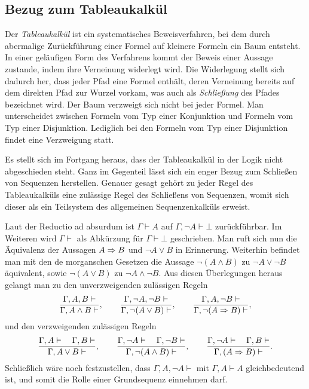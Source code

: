 \subsection{Bezug zum Tableaukalkül}

Der \emph{Tableaukalkül} ist ein
systematisches Beweisverfahren, bei dem durch abermalige Zurückführung
einer Formel auf kleinere Formeln ein Baum entsteht. In einer
geläufigen Form des Verfahrens kommt der Beweis einer Aussage zustande,
indem ihre Verneinung widerlegt wird. Die Widerlegung stellt sich
dadurch her, dass jeder Pfad eine Formel enthält, deren
Verneinung bereits auf dem direkten Pfad zur Wurzel vorkam, was auch
als \emph{Schließung} des Pfades bezeichnet wird. Der Baum verzweigt
sich nicht bei jeder Formel. Man unterscheidet zwischen
Formeln vom Typ einer Konjunktion und Formeln vom Typ einer
Disjunktion. Lediglich bei den Formeln vom Typ einer Disjunktion
findet eine Verzweigung statt.

Es stellt sich im Fortgang heraus, dass der Tableaukalkül in der Logik
nicht abgeschieden steht. Ganz im Gegenteil lässt sich ein enger Bezug
zum Schließen von Sequenzen herstellen. Genauer gesagt gehört zu jeder
Regel des Tableaukalküls eine zulässige Regel des Schließens von
Sequenzen, womit sich dieser als ein Teilsystem des allgemeinen
Sequenzenkalküls erweist.

Laut der Reductio ad absurdum ist $\Gamma\vdash A$ auf
$\Gamma,\lnot A\vdash\bot$ zurückführbar. Im Weiteren wird $\Gamma\vdash$
als Abkürzung für $\Gamma\vdash\bot$ geschrieben. Man ruft sich nun
die Äquivalenz der Aussagen $A\Rightarrow B$ und $\lnot A\lor B$ in Erinnerung.
Weiterhin befindet man mit den de morganschen Gesetzen die Aussage
$\lnot (A\land B)$ zu $\lnot A\lor\lnot B$ äquivalent, sowie $\lnot (A\lor B)$
zu $\lnot A\land\lnot B$. Aus diesen Überlegungen heraus
gelangt man zu den unverzweigenden zulässigen Regeln%
\[
\dfrac{\Gamma,A,B\vdash}{\Gamma,A\land B\vdash},\qquad
\dfrac{\Gamma,\lnot A,\lnot B\vdash}{\Gamma,\lnot (A\lor B)\vdash},\qquad
\dfrac{\Gamma,A,\lnot B\vdash}{\Gamma,\lnot(A\Rightarrow B)\vdash},
\]
und den verzweigenden zulässigen Regeln
\[
\dfrac{\Gamma,A\vdash\quad\Gamma,B\vdash}{\Gamma,A\lor B\vdash},\qquad
\dfrac{\Gamma,\lnot A\vdash\quad\Gamma,\lnot B\vdash}{\Gamma,\lnot (A\land B)\vdash},\qquad
\dfrac{\Gamma,\lnot A\vdash\quad\Gamma,B\vdash}{\Gamma,(A\Rightarrow B)\vdash}.
\]
Schließlich wäre noch festzustellen, dass $\Gamma,A,\lnot A\vdash$
mit $\Gamma,A\vdash A$ gleichbedeutend ist, und somit die Rolle einer
Grundsequenz einnehmen darf.

